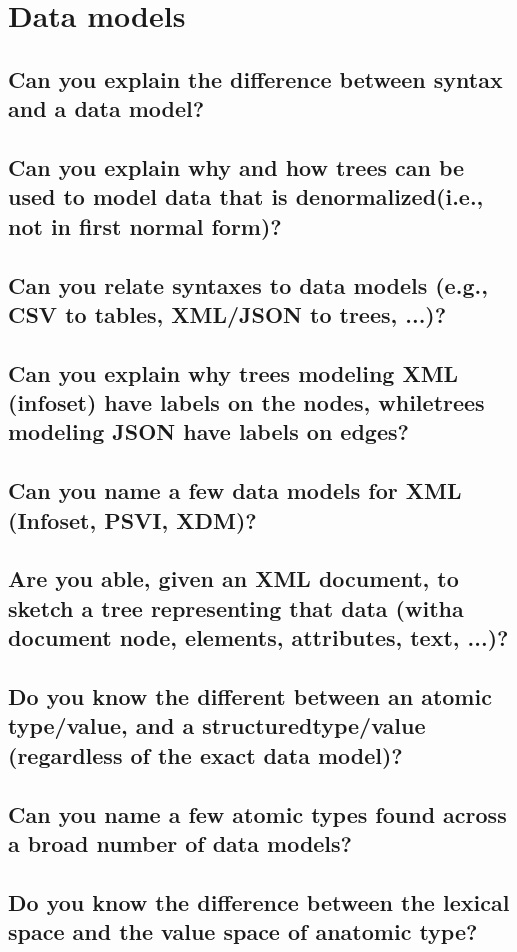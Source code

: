\documentclass{article}
\begin{document}
\pagebreak

\section{Data models}
\subsection{Can you explain the difference between syntax and a data model?}
\subsection{Can you explain why and how trees can be used to model data that is denormalized(i.e., not in first normal form)?}
\subsection{Can you relate syntaxes to data models (e.g., CSV to tables, XML/JSON to trees, ...)?}
\subsection{Can you explain why trees modeling XML (infoset) have labels on the nodes, whiletrees modeling JSON have labels on edges?}
\subsection{Can you name a few data models for XML (Infoset, PSVI, XDM)?}
\subsection{Are you able, given an XML document, to sketch a tree representing that data (witha document node, elements, attributes, text, ...)?}
\subsection{Do you know the different between an atomic type/value, and a structuredtype/value (regardless of the exact data model)?}
\subsection{Can you name a few atomic types found across a broad number of data models?}
\subsection{Do you know the difference between the lexical space and the value space of anatomic type?}
\end{document}
